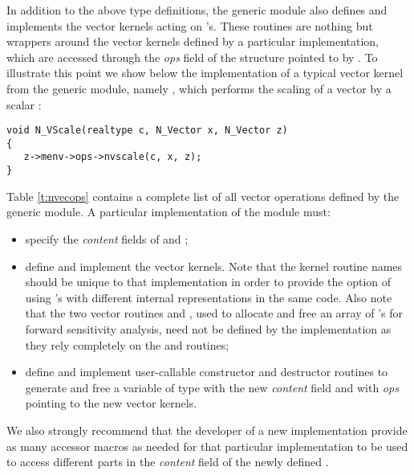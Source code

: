 In addition to the above type definitions, the generic {\nvector} module
also defines and implements the vector kernels acting on 's.
These routines are nothing but wrappers around the vector kernels defined by
a particular {\nvector} implementation, which are accessed through the {\em ops}
field of the structure pointed to by . To illustrate this point we
show below the implementation of a typical vector kernel from the
generic {\nvector} module, namely , which performs the scaling of a
vector  by a scalar :
\begin{verbatim}
void N_VScale(realtype c, N_Vector x, N_Vector z) 
{
   z->menv->ops->nvscale(c, x, z);
}
\end{verbatim}
Table \ref{t:nvecops} contains a complete list of all vector operations defined
by the generic {\nvector} module.
A particular implementation of the {\nvector} module must:
\begin{itemize}
\item specify the {\em content} fields of  and ;
\item define and implement the vector kernels. Note that the kernel routine 
  names should be unique to that implementation in order 
  to provide the option of using 's with different 
  internal representations in the same code. Also note that the two
  vector routines  and , used to allocate and
  free an array of 's for forward sensitivity analysis, need not
  be defined by the {\nvector} implementation as they rely completely
  on the  and  routines;
\item define and implement user-callable constructor and destructor
  routines to generate and free a variable of type  with
  the new {\em content} field and with {\em ops} pointing to the
  new vector kernels.
\end{itemize}
We also strongly recommend that the developer of a new 
{\nvector} implementation provide as many accessor macros 
as needed for that particular implementation to 
be used to access different parts in the {\em content} field
of the newly defined .



\newpage
\bigskip
\newlength{\colone}
\newlength{\coltwo}
\setlength{\coltwo}{\textwidth}
\addtolength{\coltwo}{-0.5in}
\addtolength{\coltwo}{-\colone}


